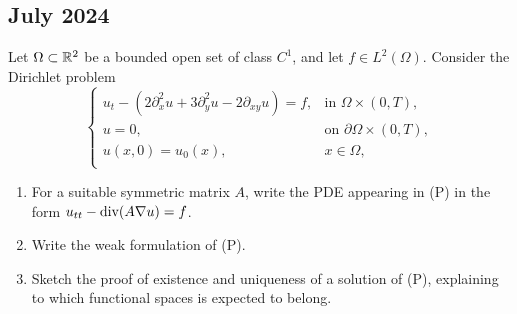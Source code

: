 \newpage
\subsection{July 2024}
\begin{exercise}
    Let \(\Omega \subset \mathbb{R}^2\) be a bounded open set of class \(C^1\), and let \(f \in L^2(\Omega)\). Consider the Dirichlet problem
    \begin{equation*}
        \begin{cases}
            u_{t} - \left(2\partial_x^2 u +  3\partial_y^2 u - 2 \partial_{xy} u\right) = f, & \text{in } \Omega \times (0, T), \\
            u = 0, & \text{on } \partial \Omega \times (0, T), \\
            u(x,0) = u_0(x), & x \in \Omega, \\
        \end{cases}
        \tag{(P)}
    \end{equation*}
    \begin{enumerate}
        \item For a suitable symmetric matrix \(A\), write the PDE appearing in (P) in the form \(u_{tt} - \text{div}(A \nabla u) = f\).
        \item Write the weak formulation of (P).
        \item Sketch the proof of existence and uniqueness of a solution of (P), explaining to which functional spaces is expected to belong.
    \end{enumerate}
\end{exercise}
